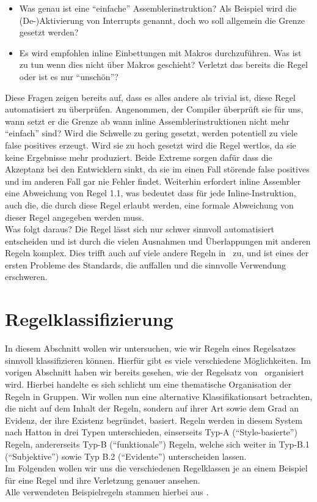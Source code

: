 \documentclass[a4paper,UKenglish,cleveref, autoref]{templates/lipics-v2019}
\begin{document}
    \begin{itemize}
        \item Was genau ist eine \enquote{einfache} Assemblerinstruktion?
            Als Beispiel wird die (De-)Aktivierung von Interrupts genannt, doch wo soll allgemein die Grenze gesetzt werden?
        \item Es wird empfohlen inline Einbettungen mit Makros durchzuführen.
            Was ist zu tun wenn dies nicht über Makros geschieht?
            Verletzt das bereits die Regel oder ist es nur \enquote{unschön}?
    \end{itemize}

    Diese Fragen zeigen bereits auf, dass es alles andere als trivial ist, diese Regel automatisiert zu überprüfen.
    Angenommen, der Compiler überprüft sie für uns, wann setzt er die Grenze ab wann inline Assemblerinstruktionen
    nicht mehr \enquote{einfach} sind?
    Wird die Schwelle zu gering gesetzt, werden potentiell zu viele false positives erzeugt.
    Wird sie zu hoch gesetzt wird die Regel wertlos, da sie keine Ergebnisse mehr produziert.
    Beide Extreme sorgen dafür dass die Akzeptanz bei den Entwicklern sinkt, da sie im einen Fall störende false positives
    und im anderen Fall gar nie Fehler findet.
    Weiterhin erfordert inline Assembler eine Abweichung von Regel 1.1, was bedeutet dass für jede Inline-Instruktion,
    auch die, die durch diese Regel erlaubt werden, eine formale Abweichung von dieser Regel angegeben werden muss.\\
    Was folgt daraus?
    Die Regel lässt sich nur schwer sinnvoll automatisiert entscheiden und ist durch die vielen Ausnahmen und Überlappungen
    mit anderen Regeln komplex.
    Dies trifft auch auf viele andere Regeln in \misra\ zu, und ist eines der ersten Probleme des Standards, die auffallen
    und die sinnvolle Verwendung erschweren.

    \section{Regelklassifizierung}
    \label{sec:regelklassifizierung}
    In diesem Abschnitt wollen wir untersuchen, wie wir Regeln eines Regelsatzes sinnvoll klassifizieren können.
    Hierfür gibt es viele verschiedene Möglichkeiten.
    Im vorigen Abschnitt haben wir bereits gesehen, wie der Regelsatz von \misra\ organisiert wird.
    Hierbei handelte es sich schlicht um eine thematische Organisation der Regeln in Gruppen.
    Wir wollen nun eine alternative Klassifikationsart betrachten, die nicht auf dem Inhalt der Regeln, sondern auf ihrer
    Art sowie dem Grad an Evidenz, der ihre Existenz begründet, basiert.
    Regeln werden in diesem System nach Hatton in drei Typen unterschieden, einserseits Typ-A (\enquote{Style-basierte}) Regeln,
    andererseits Typ-B (\enquote{funktionale}) Regeln, welche sich weiter in Typ-B.1 (\enquote{Subjektive}) sowie
    Typ B.2 (\enquote{Evidente}) unterscheiden lassen.\cite{hatton2004safer}\\
    Im Folgenden wollen wir uns die verschiedenen Regelklassen je an einem Beispiel für eine Regel und ihre Verletzung
    genauer ansehen.\\
    Alle verwendeten Beispielregeln stammen hierbei aus \misra.
\end{document}
